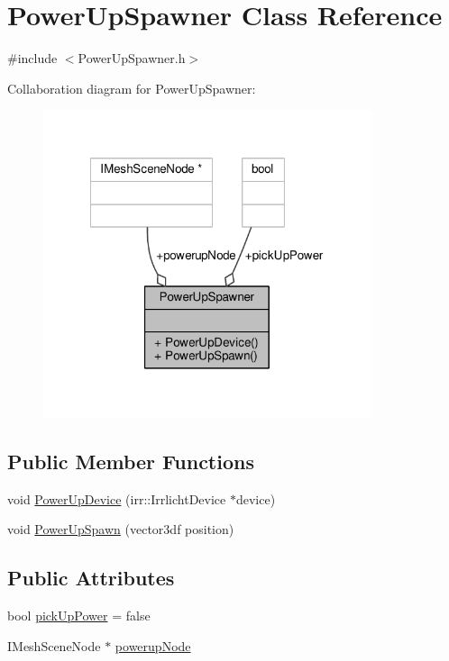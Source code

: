\hypertarget{class_power_up_spawner}{\section{Power\-Up\-Spawner Class Reference}
\label{class_power_up_spawner}
}


{\ttfamily \#include $<$Power\-Up\-Spawner.\-h$>$}



Collaboration diagram for Power\-Up\-Spawner\-:
\nopagebreak
\begin{figure}[H]
\begin{center}
\leavevmode
\includegraphics[width=273pt]{class_power_up_spawner__coll__graph}
\end{center}
\end{figure}
\subsection*{Public Member Functions}
\begin{DoxyCompactItemize}
\item 
void \hyperlink{class_power_up_spawner_ad95f01d926ce8438046b4c8f7aa99d9e}{Power\-Up\-Device} (irr\-::\-Irrlicht\-Device $\ast$device)
\item 
void \hyperlink{class_power_up_spawner_a7d10daa2eedceafdf8ceb352f6436db2}{Power\-Up\-Spawn} (vector3df position)
\end{DoxyCompactItemize}
\subsection*{Public Attributes}
\begin{DoxyCompactItemize}
\item 
bool \hyperlink{class_power_up_spawner_afa1bc4eb2e260ef8a3ca62664867ad75}{pick\-Up\-Power} = false
\item 
I\-Mesh\-Scene\-Node $\ast$ \hyperlink{class_power_up_spawner_a0bf84727961b4a9239408026f8b392e6}{powerup\-Node}
\end{DoxyCompactItemize}


